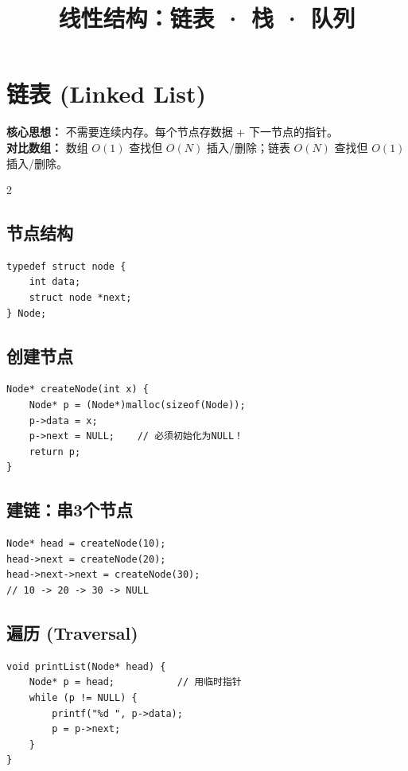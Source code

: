 \documentclass[10pt,a4paper]{article}
\title{\textbf{线性结构：链表 · 栈 · 队列}}
\author{}\date{}
\begin{document}
\maketitle\vspace{-8pt}

\section*{链表 (Linked List)}

\textbf{核心思想：} 不需要连续内存。每个节点存数据 + 下一节点的指针。\\
\textbf{对比数组：} 数组 $O(1)$ 查找但 $O(N)$ 插入/删除；链表 $O(N)$ 查找但 $O(1)$ 插入/删除。

\begin{multicols}{2}

\subsection*{节点结构}

\begin{lstlisting}
typedef struct node {
    int data;
    struct node *next;
} Node;
\end{lstlisting}

\subsection*{创建节点}

\begin{lstlisting}
Node* createNode(int x) {
    Node* p = (Node*)malloc(sizeof(Node));
    p->data = x;
    p->next = NULL;    // 必须初始化为NULL！
    return p;
}
\end{lstlisting}

\subsection*{建链：串3个节点}

\begin{lstlisting}
Node* head = createNode(10);
head->next = createNode(20);
head->next->next = createNode(30);
// 10 -> 20 -> 30 -> NULL
\end{lstlisting}

\subsection*{遍历 (Traversal)}

\begin{lstlisting}
void printList(Node* head) {
    Node* p = head;           // 用临时指针
    while (p != NULL) {
        printf("%d ", p->data);
        p = p->next;
    }
}
\end{lstlisting}


\end{multicols}
\end{document}
